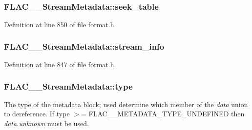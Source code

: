 \subsubsection[{\texorpdfstring{seek\+\_\+table}{seek_table}}]{ F\+L\+A\+C\+\_\+\+\_\+\+Stream\+Metadata\+::seek\+\_\+table}\hypertarget{struct_f_l_a_c_____stream_metadata_a3d27e525001843d173f8c97987663aa7}{}\label{struct_f_l_a_c_____stream_metadata_a3d27e525001843d173f8c97987663aa7}


Definition at line 850 of file format.\+h.

\subsubsection[{\texorpdfstring{stream\+\_\+info}{stream_info}}]{ F\+L\+A\+C\+\_\+\+\_\+\+Stream\+Metadata\+::stream\+\_\+info}\hypertarget{struct_f_l_a_c_____stream_metadata_a827c8671721b01ed3007adbe81ae0c6b}{}\label{struct_f_l_a_c_____stream_metadata_a827c8671721b01ed3007adbe81ae0c6b}


Definition at line 847 of file format.\+h.

\subsubsection[{\texorpdfstring{type}{type}}]{ F\+L\+A\+C\+\_\+\+\_\+\+Stream\+Metadata\+::type}\hypertarget{struct_f_l_a_c_____stream_metadata_a39fd0655464f2cc7c9c37ae715088aec}{}\label{struct_f_l_a_c_____stream_metadata_a39fd0655464f2cc7c9c37ae715088aec}
The type of the metadata block; used determine which member of the {\itshape data} union to dereference. If type $>$= F\+L\+A\+C\+\_\+\+\_\+\+M\+E\+T\+A\+D\+A\+T\+A\+\_\+\+T\+Y\+P\+E\+\_\+\+U\+N\+D\+E\+F\+I\+N\+ED then {\itshape data.\+unknown} must be used. 

